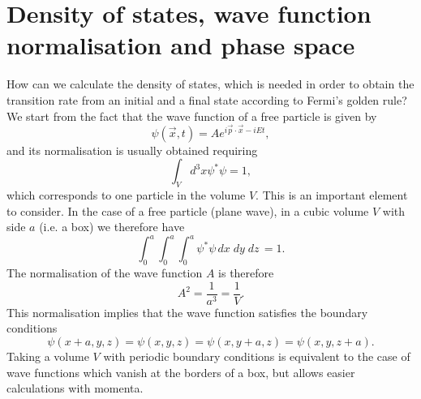 \section{Density of states, wave function normalisation and phase space}
How can we calculate the density of states, which is needed in order to obtain the transition rate from an initial and a final state according to Fermi's golden rule? We start from the fact that the wave function of a free particle is given by
\begin{equation*}
    \psi(\Vec{x},t) = Ae^{i\Vec{p}\cdot\Vec{x}-iEt},
\end{equation*}
and its normalisation is usually obtained requiring
\begin{equation*}
    \int_{V}d^3x \psi^*\psi = 1,
\end{equation*}
which corresponds to one particle in the volume $V$. This is an important element to consider. In the case of a free particle (plane wave), in a cubic volume $V$ with side $a$ (i.e. a box) we therefore have
\begin{equation*}
    \int_0^a\int_0^a\int_0^a\psi^*\psi\,dx\;dy\;dz\, = 1.
\end{equation*}
The normalisation of the wave function $A$ is therefore
\begin{equation*}
    A^2 = \frac{1}{a^3} = \frac{1}{V}.
\end{equation*}
This normalisation implies that the wave function satisfies the boundary conditions 
\begin{equation*}
    \psi(x+a,y,z) = \psi(x,y,z) = \psi(x,y+a,z) = \psi(x,y,z+a).
\end{equation*}
Taking a volume $V$ with periodic boundary conditions is equivalent to the case of  wave functions which vanish at the borders of a box, but allows easier calculations with momenta.

